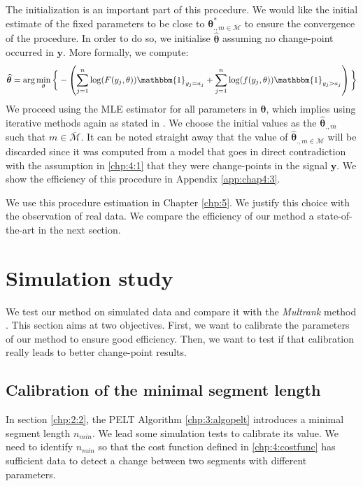 The initialization is an important part of this procedure. We would like the initial estimate of the fixed parameters to be close to $\bm\theta^*_{{.,m\in\overline{\mathcal{M}}}}$ to ensure the convergence of the procedure. In order to do so, we initialise $\widehat{\bm\theta}$ assuming no change-point occurred in $\bm y$.  More formally, we compute: 
\begin{equation}\label{chp:4:init}
\widehat{\bm\theta} = \arg\min_{\theta}\bigg\{ - \left(\sum_{j=1}^{n}\log(F(y_j,\theta))\mathbbm{1}_{y_j=a_j}+\sum_{j=1}^{n}\log(f(y_j,\theta))\mathbbm{1}_{y_j>a_j}\right)\bigg\}
\end{equation}   
We proceed using the MLE estimator for all parameters in $\bm \theta$, which implies using iterative methods again as stated in \cite{cohen1965maximum}. We choose the initial values as the $\widehat{\bm\theta}_{.,m}$ such that $m\in\overline{\mathcal{M}}$. It can be noted straight away that the value of $\widehat{\bm\theta}_{.,m\in\mathcal{M}}$ will be discarded since it was computed from a model that goes in direct contradiction with the assumption in \ref{chp:4:1} that they were change-points in the signal $\bm y$. We show the efficiency of this procedure in Appendix \ref{app:chap4:3}.  

We use this procedure estimation in Chapter \ref{chp:5}. We justify this choice with the observation of real data. We compare the efficiency of our method a state-of-the-art in the next section.

\section{Simulation study}\label{chp:4:4}

We test our method on simulated data and compare it with the \textit{Multrank} method \cite{lung2015}. This section aims at two objectives. First, we want to calibrate the parameters of our method to ensure good efficiency. Then, we want to test if that calibration really leads to better change-point results.  

\subsection{Calibration of the minimal segment length}

In section \ref{chp:2:2}, the PELT Algorithm \ref{chp:3:algopelt} introduces a minimal segment length $n_{min}$. We lead some simulation tests to calibrate its value. We need to identify $n_{min}$ so that the cost function defined in \ref{chp:4:costfunc} has sufficient data to detect a change between two segments with different parameters.

